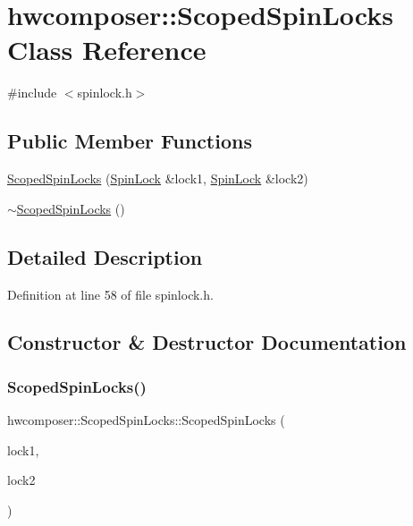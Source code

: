 \hypertarget{classhwcomposer_1_1ScopedSpinLocks}{}\section{hwcomposer\+:\+:Scoped\+Spin\+Locks Class Reference}
\label{classhwcomposer_1_1ScopedSpinLocks}


{\ttfamily \#include $<$spinlock.\+h$>$}

\subsection*{Public Member Functions}
\begin{DoxyCompactItemize}
\item 
\mbox{\hyperlink{classhwcomposer_1_1ScopedSpinLocks_a4638e477e80bad55895fcd10cfc01314}{Scoped\+Spin\+Locks}} (\mbox{\hyperlink{classhwcomposer_1_1SpinLock}{Spin\+Lock}} \&lock1, \mbox{\hyperlink{classhwcomposer_1_1SpinLock}{Spin\+Lock}} \&lock2)
\item 
\mbox{\hyperlink{classhwcomposer_1_1ScopedSpinLocks_a8268d09703631b9927dda513c4555580}{$\sim$\+Scoped\+Spin\+Locks}} ()
\end{DoxyCompactItemize}


\subsection{Detailed Description}


Definition at line 58 of file spinlock.\+h.



\subsection{Constructor \& Destructor Documentation}
\mbox{\label{classhwcomposer_1_1ScopedSpinLocks_a4638e477e80bad55895fcd10cfc01314}} 
\subsubsection{\texorpdfstring{Scoped\+Spin\+Locks()}{ScopedSpinLocks()}}
{\footnotesize\ttfamily hwcomposer\+::\+Scoped\+Spin\+Locks\+::\+Scoped\+Spin\+Locks (\begin{DoxyParamCaption}\item[{\mbox{\hyperlink{classhwcomposer_1_1SpinLock}{Spin\+Lock}} \&}]{lock1,  }\item[{\mbox{\hyperlink{classhwcomposer_1_1SpinLock}{Spin\+Lock}} \&}]{lock2 }\end{DoxyParamCaption})\hspace{0.3cm}{\ttfamily [inline]}}




